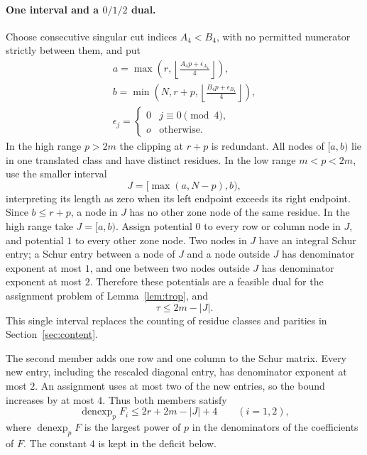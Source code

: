 \paragraph{One interval and a $0/1/2$ dual.}
Choose consecutive singular cut indices $A_4<B_4$, with no permitted
numerator strictly between them, and put
\[
 \begin{gathered} a=\max\left(r,\left\lfloor\frac{A_4p+\epsilon_{A_4}}4\right\rfloor\right),
 \\ b=\min\left(N,r+p,
       \left\lfloor\frac{B_4p+\epsilon_{B_4}}4\right\rfloor\right),
 \\ \epsilon_j=\begin{cases}0&j\equiv0\pmod4,\\o&\text{otherwise}.\end{cases}\end{gathered}
\]
In the high range $p>2m$ the clipping at $r+p$ is redundant.
All nodes of $[a,b)$ lie in one translated class and have distinct
residues.  In the low range $m<p<2m$, use the smaller interval
\[
 J=[\max(a,N-p),b),
\]
interpreting its length as zero when its left endpoint exceeds its right
endpoint.  Since $b\le r+p$, a node in $J$ has no other zone node of the
same residue.  In the high range take $J=[a,b)$.
Assign potential $0$ to every row or column node in $J$, and potential
$1$ to every other zone node. Two nodes in $J$ have an integral Schur
entry; a Schur entry between a node of $J$ and a node outside $J$ has
denominator exponent at most $1$, and one between two nodes outside $J$ has
denominator exponent at most $2$. Therefore these potentials are a feasible
dual for the assignment problem of Lemma~\ref{lem:trop}, and
\[
 \tau\le2m-|J|.
\]
This single interval replaces the counting of residue classes and parities
in Section~\ref{sec:content}.

The second member adds one row and one column to the Schur matrix. Every new
entry, including the rescaled diagonal entry, has denominator exponent at
most $2$. An assignment uses at most two of the new entries, so the bound
increases by at most $4$. Thus both members satisfy
\[
 \operatorname{denexp}_p F_i\le2r+2m-|J|+4\qquad(i=1,2),
\]
where $\operatorname{denexp}_p F$ is the largest power of $p$ in the
denominators of the coefficients of $F$. The constant $4$ is kept in the
deficit below.

